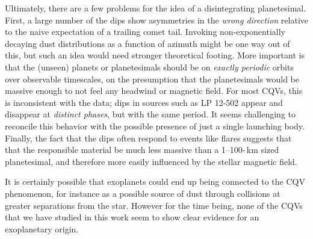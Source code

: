 \documentclass[11pt,twocolumn,tighten]{aastex63}
\begin{document}

Ultimately, there are a few problems for the idea of a
disintegrating planetesimal.
First, a large number of the
dips show asymmetries in the {\it wrong direction} relative to the
naive expectation of a trailing comet tail.  Invoking non-exponentially
decaying dust distributions as a function of azimuth might be one way out of this,
but such an idea would need stronger theoretical footing.
More important is that the (unseen) planets or planetesimals should be on {\it
exactly periodic} orbits over observable timescales, on the
presumption that the planetesimals would be massive enough to not feel
any headwind or magnetic field.  For most CQVs, this is inconsistent with the data;
dips in sources such as LP 12-502 appear and disappear at
{\it distinct phases}, but with the same period.
It seems challenging to reconcile this behavior
with the possible presence of just a single launching body.
Finally, the fact that the dips often respond to events like flares
suggests that that the responsible material be much less massive than
a 1--100-\,km sized planetesimal, and therefore more easily influenced
by the stellar magnetic field.

It is certainly possible that exoplanets could end up being connected to the
CQV phenomenon,
for instance as a possible source of dust through collisions at greater separations
from the star.
However for the time being, none of the CQVs that we have studied in this
work seem to show clear evidence for an exoplanetary origin.




\end{document}
